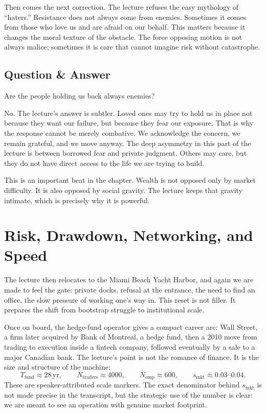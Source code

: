 Then comes the next correction. The lecture refuses the easy mythology of ``haters.'' Resistance does not always come from enemies. Sometimes it comes from those who love us and are afraid on our behalf. This matters because it changes the moral texture of the obstacle. The force opposing motion is not always malice; sometimes it is care that cannot imagine risk without catastrophe.

\subsection{Question \& Answer}

Are the people holding us back always enemies?

No. The lecture's answer is subtler. Loved ones may try to hold us in place not because they want our failure, but because they fear our exposure. That is why the response cannot be merely combative. We acknowledge the concern, we remain grateful, and we move anyway. The deep asymmetry in this part of the lecture is between borrowed fear and private judgment. Others may care, but they do not have direct access to the life we are trying to build.

This is an important beat in the chapter. Wealth is not opposed only by market difficulty. It is also opposed by social gravity. The lecture keeps that gravity intimate, which is precisely why it is powerful.

\section{Risk, Drawdown, Networking, and Speed}

The lecture then relocates to the Miami Beach Yacht Harbor, and again we are made to feel the gate: private docks, refusal at the entrance, the need to find an office, the slow pressure of working one's way in. This reset is not filler. It prepares the shift from bootstrap struggle to institutional scale.

Once on board, the hedge-fund operator gives a compact career arc: Wall Street, a firm later acquired by Bank of Montreal, a hedge fund, then a 2010 move from trading to execution inside a fintech company, followed eventually by a sale to a major Canadian bank. The lecture's point is not the romance of finance. It is the size and structure of the machine:
\begin{equation}
T_{\mathrm{fund}} \approx 28\,\mathrm{yr},
\qquad
N_{\mathrm{traders}} \approx 4000,
\qquad
N_{\mathrm{emp}} \approx 600,
\qquad
s_{\mathrm{mkt}} \approx 0.03\text{--}0.04.
\end{equation}
These are speaker-attributed scale markers. The exact denominator behind \(s_{\mathrm{mkt}}\) is not made precise in the transcript, but the strategic use of the number is clear: we are meant to see an operation with genuine market footprint.

